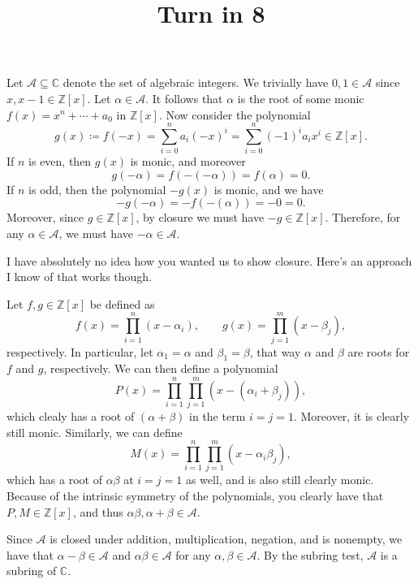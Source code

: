 \documentclass[11pt, letterpaper]{article}
\title{Turn in 8}
\begin{document}
\makeproblem

Let $\mathcal{A} \subseteq \mathbb{C} $ denote the set of algebraic integers. We trivially have $0,1\in \mathcal{A} $ since $x,x-1\in \mathbb{Z} [x]$. Let $\alpha \in \mathcal{A} $. It follows that $\alpha $ is the root of some monic $f(x)=x^n+\cdots +a_0$ in $\mathbb{Z} [x]$. Now consider the polynomial
\[
	g(x)\coloneqq f(-x)=\sum_{i=0}^{n} a_i(-x)^i=\sum_{i=0}^{n} (-1)^i a_i x^i\in\mathbb{Z} [x]
.\]
If $n$ is even, then $g(x)$ is monic, and moreover
\[
	g(-\alpha )=f(-(-\alpha ))=f(\alpha )=0
.\]
If $n$ is odd, then the polynomial $-g(x)$ is monic, and we have
\[
	-g(-\alpha )=-f(-(\alpha ))=-0=0
.\]
Moreover, since $g\in\mathbb{Z} [x]$, by closure we must have $-g\in\mathbb{Z} [x]$. Therefore, for any $\alpha \in\mathcal{A} $, we must have $-\alpha \in \mathcal{A} $.

I have absolutely no idea how you wanted us to show closure. Here's an approach I know of that works though.

Let $f,g\in\mathbb{Z} [x]$ be defined as
\[
	f(x)=\prod_{i=1}^{n} (x-\alpha _i),\qquad g(x)=\prod_{j=1}^{m} (x-\beta _j),
\]
respectively. In particular, let $\alpha _1=\alpha $ and $\beta _1=\beta $, that way $\alpha $ and $\beta $ are roots for $f$ and $g$, respectively. We can then define a polynomial
\[
	P(x)=\prod_{i=1}^{n} \prod_{j=1}^{m} \left( x-(\alpha _i+\beta _j) \right) ,
\]
which clealy has a root of $(\alpha +\beta )$ in the term $i=j=1$. Moreover, it is clearly still monic. Similarly, we can define
\[
	M(x)=\prod_{i=1}^{n} \prod_{j=1}^{m} \left( x-\alpha _i\beta _j \right) ,
\]
which has a root of $\alpha \beta $ at $i=j=1$ as well, and is also still clearly monic. Because of the intrinsic symmetry of the polynomials, you clearly have that $P,M\in\mathbb{Z} [x]$, and thus $\alpha\beta ,\alpha +\beta \in \mathcal{A} $.

Since $\mathcal{A} $ is closed under addition, multiplication, negation, and is nonempty, we have that $\alpha -\beta \in \mathcal{A} $ and $\alpha \beta \in \mathcal{A} $ for any $\alpha ,\beta \in \mathcal{A} $. By the subring test, $\mathcal{A} $ is a subring of $\mathbb{C} $.
\end{document}
